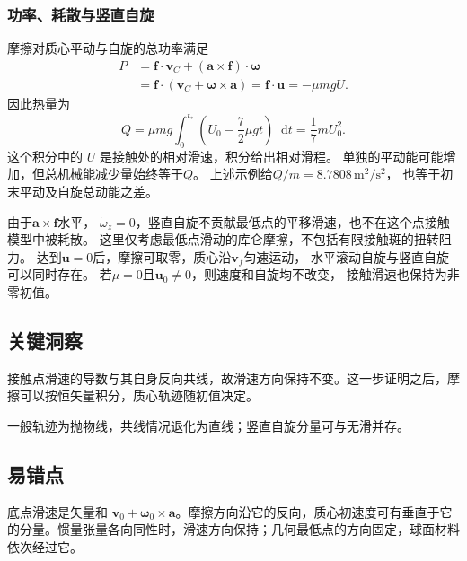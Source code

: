 \documentclass[UTF8,fontset=fandol,a4paper,11pt]{ctexart}
\newcommand{\dd}{\mathop{}\!\mathrm{d}}
\begin{document}
\subsubsection*{功率、耗散与竖直自旋}
摩擦对质心平动与自旋的总功率满足
\[
\begin{aligned}
P&=\boldsymbol f\cdot\boldsymbol v_C
+(\boldsymbol a\times\boldsymbol f)\cdot\boldsymbol\omega\\
&=\boldsymbol f\cdot(\boldsymbol v_C+\boldsymbol\omega\times\boldsymbol a)
=\boldsymbol f\cdot\boldsymbol u=-\mu mg U.
\end{aligned}
\]
因此热量为
\[
Q=\mu mg\int_0^{t_*}\left(U_0-\frac72\mu gt\right)\dd t
=\frac17mU_0^2.
\]
这个积分中的 $U$ 是接触处的相对滑速，积分给出相对滑程。
单独的平动能可能增加，但总机械能减少量始终等于$Q$。
上述示例给$Q/m=8.7808\,\mathrm{m^2/s^2}$，
也等于初末平动及自旋总动能之差。

由于$\boldsymbol a\times\boldsymbol f$水平，
$\dot\omega_z=0$，竖直自旋不贡献最低点的平移滑速，也不在这个点接触模型中被耗散。
这里仅考虑最低点滑动的库仑摩擦，不包括有限接触斑的扭转阻力。
达到$\boldsymbol u=0$后，摩擦可取零，质心沿$\boldsymbol v_f$匀速运动，
水平滚动自旋与竖直自旋可以同时存在。
若$\mu=0$且$\boldsymbol u_0\ne0$，则速度和自旋均不改变，
接触滑速也保持为非零初值。




\subsection*{关键洞察}

接触点滑速的导数与其自身反向共线，故滑速方向保持不变。这一步证明之后，摩擦可以按恒矢量积分，质心轨迹随初值决定。

一般轨迹为抛物线，共线情况退化为直线；竖直自旋分量可与无滑并存。



\subsection*{易错点}

底点滑速是矢量和 $\boldsymbol v_0+\boldsymbol\omega_0\times\boldsymbol a$。摩擦方向沿它的反向，质心初速度可有垂直于它的分量。惯量张量各向同性时，滑速方向保持；几何最低点的方向固定，球面材料依次经过它。

\end{document}

